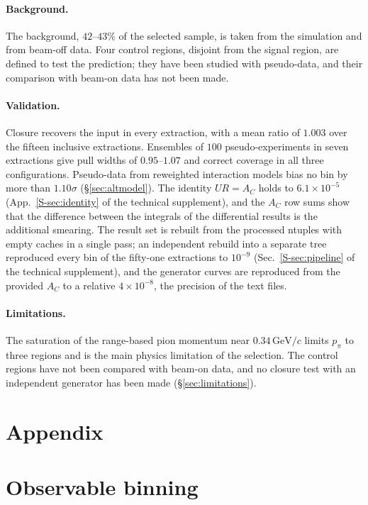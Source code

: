\documentclass[11pt,a4paper]{article}
\newcommand{\GeVc}{\,\text{GeV}\!/c}
\newcommand{\suppref}[2]{#1~\ref{S-#2} of the technical supplement}
\begin{document}
\paragraph{Background.}
The background, $42$--$43\%$ of the selected sample, is taken from the simulation and from beam-off
data. Four control regions, disjoint from the signal region, are defined to test the prediction; they
have been studied with pseudo-data, and their comparison with beam-on data has not been made.

\paragraph{Validation.}
Closure recovers the input in every extraction, with a mean ratio of $1.003$ over the fifteen
inclusive extractions. Ensembles of $100$ pseudo-experiments in seven extractions give pull widths of
$0.95$--$1.07$ and correct coverage in all three configurations. Pseudo-data from reweighted
interaction models bias no bin by more than $1.10\sigma$ (\S\ref{sec:altmodel}). The identity $UR=A_C$ holds to
$6.1\times10^{-5}$ (\suppref{App.}{sec:identity}), and the $A_C$ row sums show that the difference
between the integrals of the differential results is the additional smearing. The result set is
rebuilt from the processed ntuples with empty caches in a single pass; an independent rebuild into a
separate tree reproduced every bin of the fifty-one extractions to $10^{-9}$
(\suppref{Sec.}{sec:pipeline}), and the generator curves are reproduced from the provided $A_C$ to a
relative $4\times10^{-8}$, the precision of the text files.

\paragraph{Limitations.}
The saturation of the range-based pion momentum near $0.34\GeVc$ limits $p_\pi$ to three regions and is
the main physics limitation of the selection. The control regions have not been compared with
beam-on data, and no closure test with an independent generator has been made
(\S\ref{sec:limitations}).



%
\section*{Appendix}
\appendix

\section{Observable binning}
\label{app:binning}
\end{document}
